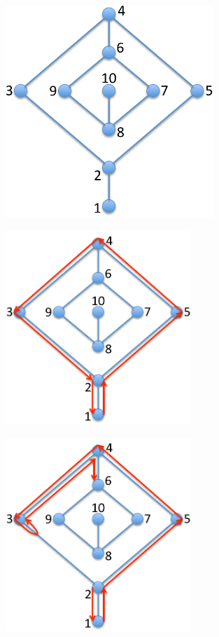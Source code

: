 \documentclass{beamer} %
\begin{document}
\begin{frame}
  \centering
  \includegraphics[height=80mm]{assets/maze-b2-crop.pdf}
\end{frame}

\begin{frame}
  \centering
  \includegraphics[width=70mm]{assets/maze-b3-crop.pdf}
\end{frame}

\begin{frame}
  \centering
  \includegraphics[width=70mm]{assets/maze-b4-crop.pdf}
\end{frame}
\end{document}
